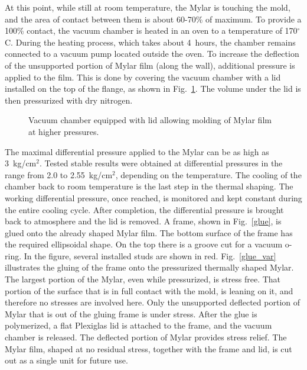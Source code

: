 At this point, while still at room temperature, the Mylar is touching 
the mold, and the area of contact between them is about 60-70\% of maximum. 
To provide a 100\% contact, the vacuum chamber is heated in an oven to
a temperature of 170$^\circ$C. During the heating process, which takes about 
4~hours, the chamber remains connected to a vacuum pump located outside the 
oven.  To increase the deflection of the unsupported portion of Mylar film 
(along the wall), additional pressure is applied to the film.  This is done 
by covering the vacuum chamber with a lid installed on the top of the flange, 
as shown in Fig.~\ref{Mylar_pres}.  The volume under the lid is then 
pressurized with dry nitrogen.

\begin{figure}
\begin{center}
\caption{\small{Vacuum chamber equipped with lid allowing molding of Mylar 
film at higher pressures.}}
\label{Mylar_pres}
\end{center}
\end{figure} 

The maximal differential pressure applied to the Mylar can be as high 
as 3~kg/cm$^2$.  Tested stable results were obtained at differential 
pressures in the range from 2.0 to 2.55~kg/cm$^2$, depending on the
temperature.  The cooling of the chamber back to room temperature is the 
last step in the thermal shaping.  The working differential pressure, once 
reached, is monitored and kept constant during the entire cooling cycle. 
After completion, the differential pressure is brought back to atmosphere 
and the lid is removed.  A frame, shown in Fig.~\ref{glue}, is glued onto 
the already shaped Mylar film. The bottom surface of the frame has the 
required ellipsoidal shape.  On the top there is a groove cut for a vacuum 
o-ring.  In the figure, several installed studs are shown in red. 
Fig.~\ref{glue_var} illustrates the gluing of the frame onto the pressurized 
thermally shaped Mylar.  The largest portion of the Mylar, even while 
pressurized, is stress free.  That portion of the surface that is in full 
contact with the mold, is leaning on it, and therefore no stresses are 
involved here. Only the unsupported deflected portion of Mylar that is out 
of the gluing frame is under stress.  After the glue is polymerized, a flat 
Plexiglas lid is attached to the frame, and the vacuum chamber is released. 
The deflected portion of Mylar provides stress relief.  The Mylar film, 
shaped at no residual stress, together with the frame and lid, is cut out as a 
single unit for future use. 

